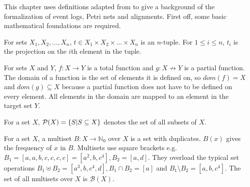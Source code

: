 This chapter uses definitions adapted from \cite{van2013process, hompes2015detecting, baier2015matching} to give a background of the formalization of event logs, Petri nets and alignments. First off, some basic mathematical foundations are required.

\begin{definition}[Tuples]
For sets $X_1, X_2, \ldots, X_n$, $t \in X_1 \times X_2 \times \ldots \times X_n$ is an $n$-tuple. For $1\le i\le n$, $t_i$ is the projection on the $i$th element in the tuple.
\end{definition}

\begin{definition}[Functions]
For sets $X$ and $Y$, $f:X\to Y$ is a total function and $g: X\nrightarrow Y$ is a partial function. The domain of a function is the set of elements it is defined on, so $dom(f) = X$ and $dom(g) \subseteq X$ because a partial function does not have to be defined on every element. All elements in the domain are mapped to an element in the target set $Y$.
\end{definition}

\begin{definition}[Powerset]
For a set $X$, $\mathcal{P}(X)=\{S|S \subseteq X\}$ denotes the set of all subsets of $X$.
\end{definition}

\begin{definition}[Multiset]
For a set $X$, a multiset $B:X\to \mathbb{N}_0$ over $X$ is a set with duplicates. $B(x)$ gives the frequency of $x$ in $B$. Multisets use square brackets e.g. $B_1=[a,a,b,c,c,c,c]=[a^2,b,c^4], B_2=[a,d]$. They overload the typical set operations $B_1 \uplus B_2 = [a^3,b,c^4,d], B_1 \cap B_2 = [a]$ and $B_1 \setminus B_2 = [a,b,c^4]$. The set of all multisets over $X$ is $\mathcal{B}(X)$.
\end{definition}

